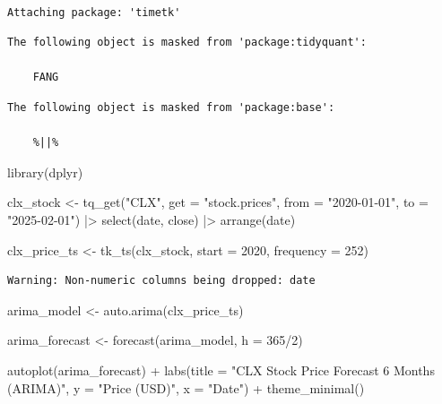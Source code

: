 \documentclass[
  letterpaper,
  DIV=11,
  numbers=noendperiod]{scrartcl}
\newenvironment{Shaded}{\begin{snugshade}}{\end{snugshade}}
\newcommand{\AttributeTok}[1]{\textcolor[rgb]{0.40,0.45,0.13}{#1}}
\newcommand{\DecValTok}[1]{\textcolor[rgb]{0.68,0.00,0.00}{#1}}
\newcommand{\FunctionTok}[1]{\textcolor[rgb]{0.28,0.35,0.67}{#1}}
\newcommand{\NormalTok}[1]{\textcolor[rgb]{0.00,0.23,0.31}{#1}}
\newcommand{\OtherTok}[1]{\textcolor[rgb]{0.00,0.23,0.31}{#1}}
\newcommand{\SpecialCharTok}[1]{\textcolor[rgb]{0.37,0.37,0.37}{#1}}
\newcommand{\StringTok}[1]{\textcolor[rgb]{0.13,0.47,0.30}{#1}}
\begin{document}
\begin{verbatim}

Attaching package: 'timetk'
\end{verbatim}

\begin{verbatim}
The following object is masked from 'package:tidyquant':

    FANG
\end{verbatim}

\begin{verbatim}
The following object is masked from 'package:base':

    %||%
\end{verbatim}

\begin{Shaded}
\begin{Highlighting}[]
\FunctionTok{library}\NormalTok{(dplyr)}

\NormalTok{clx\_stock }\OtherTok{\textless{}{-}} \FunctionTok{tq\_get}\NormalTok{(}\StringTok{"CLX"}\NormalTok{, }
                   \AttributeTok{get =} \StringTok{"stock.prices"}\NormalTok{, }
                   \AttributeTok{from =} \StringTok{"2020{-}01{-}01"}\NormalTok{, }
                   \AttributeTok{to =} \StringTok{"2025{-}02{-}01"}\NormalTok{) }\SpecialCharTok{|\textgreater{}}
  \FunctionTok{select}\NormalTok{(date, close) }\SpecialCharTok{|\textgreater{}}
  \FunctionTok{arrange}\NormalTok{(date)}

\NormalTok{clx\_price\_ts }\OtherTok{\textless{}{-}} \FunctionTok{tk\_ts}\NormalTok{(clx\_stock, }\AttributeTok{start =} \DecValTok{2020}\NormalTok{, }
              \AttributeTok{frequency =} \DecValTok{252}\NormalTok{)}
\end{Highlighting}
\end{Shaded}

\begin{verbatim}
Warning: Non-numeric columns being dropped: date
\end{verbatim}

\begin{Shaded}
\begin{Highlighting}[]
\NormalTok{arima\_model }\OtherTok{\textless{}{-}} \FunctionTok{auto.arima}\NormalTok{(clx\_price\_ts)}

\NormalTok{arima\_forecast }\OtherTok{\textless{}{-}} \FunctionTok{forecast}\NormalTok{(arima\_model, }\AttributeTok{h =} \DecValTok{365}\SpecialCharTok{/}\DecValTok{2}\NormalTok{)}

\FunctionTok{autoplot}\NormalTok{(arima\_forecast) }\SpecialCharTok{+}
  \FunctionTok{labs}\NormalTok{(}\AttributeTok{title =} \StringTok{"CLX Stock Price Forecast 6 Months (ARIMA)"}\NormalTok{,}
    \AttributeTok{y =} \StringTok{"Price (USD)"}\NormalTok{,}
    \AttributeTok{x =} \StringTok{"Date"}\NormalTok{) }\SpecialCharTok{+}
  \FunctionTok{theme\_minimal}\NormalTok{()}
\end{Highlighting}
\end{Shaded}
\end{document}
